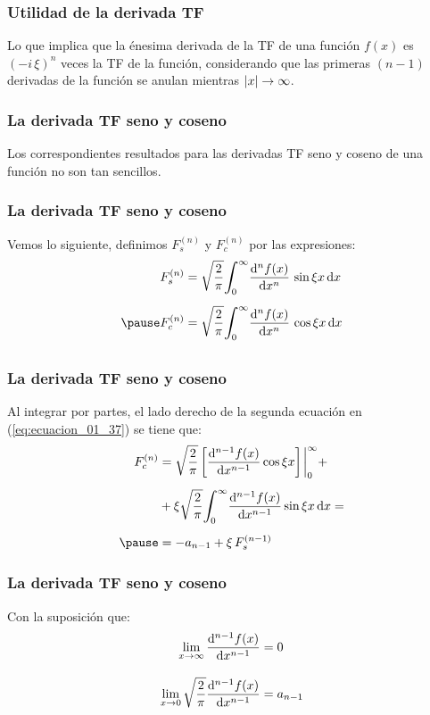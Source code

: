 \begin{frame}
  \frametitle{Utilidad de la derivada TF}
Lo que implica que la énesima derivada de la TF de una función $f (x)$ es $(- i \, \xi)^{n}$ veces la TF de la función, considerando que las primeras $(n - 1)$ derivadas de la función se anulan mientras $\abs{x} \to \infty$.
\end{frame}
\begin{frame}
\frametitle{La derivada TF seno y coseno}
Los correspondientes resultados para las derivadas TF seno y coseno de una función no son tan sencillos. 
\end{frame}
\begin{frame}
\frametitle{La derivada TF seno y coseno}
Vemos lo siguiente, definimos $F_{s}^{(n)}$ y $F_{c}^{(n)}$ por las expresiones:
\pause
\begin{eqnarray}
\begin{aligned}
F_{s}^{(n)} &= \sqrt{\dfrac{2}{\pi}} \scaleint{6ex}_{\bs 0}^{\infty} \dv[n]{f (x)}{x} \, \sin \xi x \dd{x} \\[0.5em] \pause
F_{c}^{(n)} &= \sqrt{\dfrac{2}{\pi}} \scaleint{6ex}_{\bs 0}^{\infty} \dv[n]{f (x)}{x} \, \cos \xi x \dd{x} \\[0.5em]
\end{aligned}
\label{eq:ecuacion_01_37}
\end{eqnarray}
\end{frame}
\begin{frame}
\frametitle{La derivada TF seno y coseno}
Al integrar por partes, el lado derecho de la segunda ecuación en (\ref{eq:ecuacion_01_37}) se tiene que:
\pause
\begin{eqnarray}
\begin{aligned}[b]
F_{c}^{(n)} &= \sqrt{\dfrac{2}{\pi}} \, \bigg[ \dv[n-1]{f (x)}{x} \cos \xi x \bigg] \eval_{0}^{\infty} + \\[0.5em]
&+ \xi \sqrt{\dfrac{2}{\pi}} \scaleint{6ex}_{\bs 0}^{\infty} \dv[n-1]{f (x)}{x} \sin \xi x \dd{x} = \\[0.5em] \pause
&= -a_{n-1} + \xi \, F_{s}^{(n-1)}
\end{aligned}
\label{eq:ecuacion_01_38}
\end{eqnarray}
\end{frame}
\begin{frame}
\frametitle{La derivada TF seno y coseno}
Con la suposición que:
\pause
\begin{align*}
\lim_{x \to \infty} \dv[n-1]{f (x)}{x} &= 0 \\[1em]
\lim_{x \to 0}  \sqrt{\dfrac{2}{\pi}} \dv[n-1]{f (x)}{x} &= a_{n-1}
\end{align*}
\end{frame}
